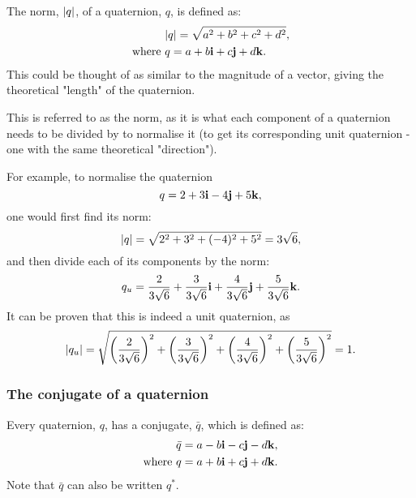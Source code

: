 \documentclass[10pt]{article}
\begin{document}
The norm, $\abs{q}$, of a quaternion, $q$, is defined as:
\begin{equation}
    \begin{aligned}
        &\abs{q} = \sqrt{a^2 + b^2 + c^2 + d^2}, \\
        \text{where } & q = a + b\vb{i} + c\vb{j} + d\vb{k}.
    \end{aligned} 
\end{equation}
This could be thought of as similar to the magnitude of a vector, giving the theoretical "length" of the quaternion. \cite{Math431}

This is referred to as the norm, as it is what each component of a quaternion needs to be divided by to normalise it (to get its corresponding unit quaternion - one with the same theoretical "direction").

For example, to normalise the quaternion
\begin{equation}
    q = 2 + 3\vb{i} - 4\vb{j} + 5\vb{k},
\end{equation}
one would first find its norm:
\begin{equation}
    \abs{q} = \sqrt{2^2 + 3^2 + (-4)^2 + 5^2} = 3\sqrt{6},
\end{equation}
and then divide each of its components by the norm:
\begin{equation}
    q_u = \frac{2}{3\sqrt{6}}+\frac{3}{3\sqrt{6}}\vb{i}+\frac{4}{3\sqrt{6}}\vb{j}+\frac{5}{3\sqrt{6}}\vb{k}.
\end{equation}
It can be proven that this is indeed a unit quaternion, as
\begin{equation}
    \abs{q_u} = \sqrt{\left(\frac{2}{3\sqrt{6}}\right)^2+\left(\frac{3}{3\sqrt{6}}\right)^2+\left(\frac{4}{3\sqrt{6}}\right)^2+\left(\frac{5}{3\sqrt{6}}\right)^2} = 1.
\end{equation}

\subsubsection{The conjugate of a quaternion} \label{qBarDef}

Every quaternion, $q$, has a conjugate, $\bar{q}$, which is defined as:
\begin{equation}
    \begin{aligned}
        &\bar{q} = a - b\vb{i} - c\vb{j} - d\vb{k}, \\
        \text{where } & q = a + b\vb{i} + c\vb{j} + d\vb{k}.
    \end{aligned}
\end{equation}
Note that $\bar{q}$ can also be written $q^*$. \cite{DRose}
\end{document}
